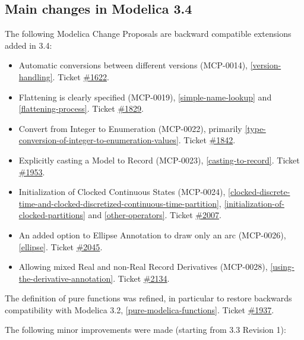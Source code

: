 \documentclass[10pt,a4paper]{report}
\def\doublelabel#1{\label{#1}\hypertarget{#1}{}}
\begin{document}
\subsection{Main changes in Modelica 3.4}\doublelabel{main-changes-in-modelica-3-4}


The following Modelica Change Proposals are backward compatible
extensions added in 3.4:

\begin{itemize}
\item
  Automatic conversions between different versions (MCP-0014), 
  \ref{version-handling}. Ticket
  \href{https://trac.modelica.org/Modelica/ticket/1622}{\#1622}.
\item
  Flattening is clearly specified (MCP-0019), \ref{simple-name-lookup} and \ref{flattening-process}.
  Ticket \href{https://trac.modelica.org/Modelica/ticket/1829}{\#1829}.
\item
  Convert from Integer to Enumeration (MCP-0022), primarily 
  \ref{type-conversion-of-integer-to-enumeration-values}. Ticket
  \href{https://trac.modelica.org/Modelica/ticket/1842}{\#1842}.
\item
  Explicitly casting a Model to Record (MCP-0023), \ref{casting-to-record}.
  Ticket \href{https://trac.modelica.org/Modelica/ticket/1953}{\#1953}.
\item
  Initialization of Clocked Continuous States (MCP-0024), 
  \ref{clocked-discrete-time-and-clocked-discretized-continuous-time-partition},
  \ref{initialization-of-clocked-partitions} and \ref{other-operators}. Ticket
  \href{https://trac.modelica.org/Modelica/ticket/2007}{\#2007}.
\item
  An added option to Ellipse Annotation to draw only an arc (MCP-0026),
  \ref{ellipse}. Ticket
  \href{https://trac.modelica.org/Modelica/ticket/2045}{\#2045}.
\item
  Allowing mixed Real and non-Real Record Derivatives (MCP-0028),
  \ref{using-the-derivative-annotation}. Ticket
  \href{https://trac.modelica.org/Modelica/ticket/2134}{\#2134}.
\end{itemize}

The definition of pure functions was refined, in particular to restore
backwards compatibility with Modelica 3.2, \ref{pure-modelica-functions}. Ticket
\href{https://trac.modelica.org/Modelica/ticket/1937}{\#1937}.

The following minor improvements were made (starting from 3.3 Revision
1):
\end{document}
